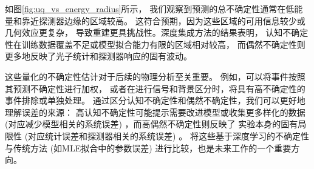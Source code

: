 
如图\ref{fig:uq_vs_energy_radius}所示，
我们观察到预测的总不确定性通常在低能量和靠近探测器边缘的区域较高。
这符合预期，因为这些区域的可用信息较少或几何效应更复杂，
导致重建更具挑战性。深度集成方法的结果表明，
认知不确定性在训练数据覆盖不足或模型拟合能力有限的区域相对较高，
而偶然不确定性则更多地反映了光子统计和探测器响应的固有波动。


这些量化的不确定性估计对于后续的物理分析至关重要。
例如，可以将事件按照其预测不确定性进行加权，
或者在进行信号和背景区分时，将具有高不确定性的事件排除或单独处理。
通过区分认知不确定性和偶然不确定性，我们可以更好地理解误差的来源：
高认知不确定性可能提示需要改进模型或收集更多样化的数据 
(对应减少模型相关的系统误差) ，而高偶然不确定性则反映了
实验本身的固有局限性 (对应统计误差和探测器相关的系统误差) 。
将这些基于深度学习的不确定性与传统方法 
(如MLE拟合中的参数误差) 进行比较，也是未来工作的一个重要方向。

